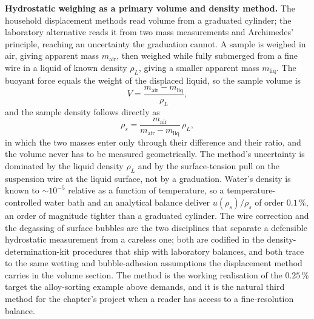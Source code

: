 \begin{mastery}
\textbf{Hydrostatic weighing as a primary volume and density
method.} The household displacement methods read volume from a
graduated cylinder; the laboratory alternative reads it from two mass
measurements and Archimedes' principle, reaching an uncertainty the
graduation cannot. A sample is weighed in air, giving apparent mass
$m_{\mathrm{air}}$, then weighed while fully submerged from a fine
wire in a liquid of known density $\rho_{L}$, giving a smaller
apparent mass $m_{\mathrm{liq}}$. The buoyant force equals the weight
of the displaced liquid, so the sample volume is
\[
V = \frac{m_{\mathrm{air}} - m_{\mathrm{liq}}}{\rho_{L}},
\]
and the sample density follows directly as
\[
\rho_{s} = \frac{m_{\mathrm{air}}}{m_{\mathrm{air}} -
m_{\mathrm{liq}}}\,\rho_{L},
\]
in which the two masses enter only through their difference and their
ratio, and the volume never has to be measured geometrically. The
method's uncertainty is dominated by the liquid density $\rho_{L}$
and by the surface-tension pull on the suspension wire at the liquid
surface, not by a graduation. Water's density is known to
$\sim 10^{-5}$ relative as a function of temperature, so a
temperature-controlled water bath and an analytical balance deliver
$u(\rho_{s})/\rho_{s}$ of order $0.1\,\%$, an order of magnitude
tighter than a graduated cylinder. The wire correction and the
degassing of surface bubbles are the two disciplines that separate a
defensible hydrostatic measurement from a careless one; both are
codified in the density-determination-kit procedures that ship with
laboratory balances, and both trace to the same wetting and
bubble-adhesion assumptions the displacement method carries in the
volume section. The method is the working realisation of the
$0.25\,\%$ target the alloy-sorting example above demands, and it is
the natural third method for the chapter's project when a reader has
access to a fine-resolution balance.
\end{mastery}

